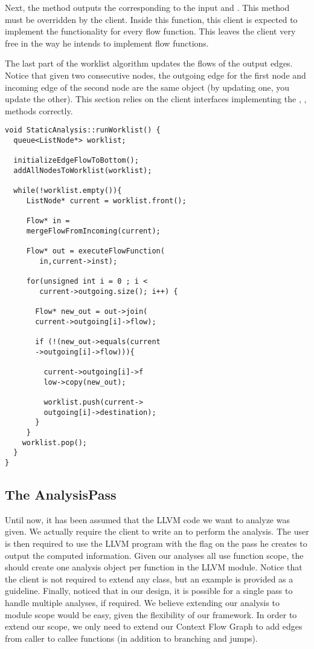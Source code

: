 Next, the  method outputs the  corresponding to the input  and . This method must be overridden by the client. Inside this function, this client is expected to implement the functionality for every flow function. This leaves the client very free in the way he intends to implement flow functions.

The last part of the worklist algorithm updates the flows of the output edges. Notice that given two consecutive nodes, the outgoing edge for the first node and incoming edge of the second node are the same object (by updating one, you update the other). This section relies on the client interfaces implementing the , ,  methods correctly.

\begin{lstlisting}[caption=Worklist Algorithm, label=worklist]
void StaticAnalysis::runWorklist() {
  queue<ListNode*> worklist;
  
  initializeEdgeFlowToBottom();
  addAllNodesToWorklist(worklist);
  
  while(!worklist.empty()){
     ListNode* current = worklist.front();
     
     Flow* in = 
     mergeFlowFromIncoming(current);
     
     Flow* out = executeFlowFunction(
     	in,current->inst);
     
     for(unsigned int i = 0 ; i < 
     	current->outgoing.size(); i++) {
       
       Flow* new_out = out->join(
       current->outgoing[i]->flow);
     
       if (!(new_out->equals(current
       ->outgoing[i]->flow))){
     
         current->outgoing[i]->f
         low->copy(new_out);
     
         worklist.push(current->
         outgoing[i]->destination);
       }
     }
    worklist.pop();
  }
}
\end{lstlisting}

\subsection{The AnalysisPass}

Until now, it has been assumed that the LLVM code we want to analyze was given. We actually require the client to write an  to perform the analysis. The user is then required to use the LLVM  program with the  flag on the pass he creates to output the computed information. Given our analyses all use function scope, the  should create one analysis object per function in the LLVM module. Notice that the client is not required to extend any class, but an example  is provided as a guideline. Finally, noticed that in our design, it is possible for a single pass to handle multiple analyses, if required. We believe extending our analysis to module scope would be easy, given the flexibility of our framework. In order to extend our scope, we only need to extend our Context Flow Graph to add edges from caller to callee functions (in addition to branching and jumps).